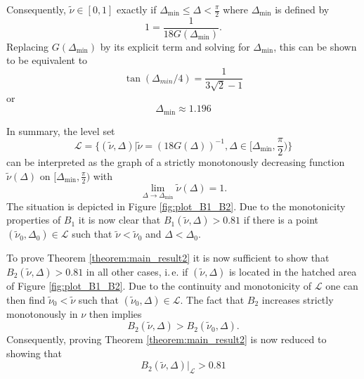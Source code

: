 \documentclass{article}
\newcommand{\ite}{i.\,e.\xspace}
\begin{document}
Consequently, $\tilde\nu\in[0,1]$ exactly if $\Delta_{\text{min}}\le\Delta<\frac\pi 2$ where $\Delta_{\text{min}}$ is defined by
\begin{equation}\label{eq:def_Delta_min}
    1 = \frac{1}{18G(\Delta_{\text{min}})}.
\end{equation}
Replacing $G(\Delta_{\text{min}})$ by its explicit term and solving for $\Delta_{\text{min}}$, this can be shown to be equivalent to
\[\tan(\Delta_{min}/4) = \frac{1}{3\sqrt 2 - 1}\]
or
\[\Delta_{\text{min}}\approx 1.196\]

In summary, the level set
\begin{equation}
    \mathcal{L} = \{(\tilde\nu,\Delta)|  \tilde\nu = (18G(\Delta))^{-1}, \Delta\in[\Delta_{\text{min}}, \frac\pi 2)\}
\end{equation}
can be interpreted as the graph of a strictly monotonously decreasing function $\tilde\nu(\Delta)$ on $[\Delta_{\text{min}},\frac\pi 2)$ with
\[\lim_{\Delta\rightarrow\Delta_{\text{min}}}\tilde\nu(\Delta) = 1.\]
The situation is depicted in Figure \ref{fig:plot_B1_B2}.
Due to the monotonicity properties of $B_1$ it is now clear that $B_1(\tilde\nu, \Delta) > 0.81$ if there is a point $(\tilde\nu_0 ,\Delta_0) \in \mathcal{L}$ such that $\tilde\nu < \tilde\nu_0$ and $\Delta < \Delta_0$.

To prove Theorem \ref{theorem:main_result2} it is now sufficient to show that $B_2(\tilde\nu, \Delta) > 0.81$ in all other cases, \ite if $(\tilde\nu ,\Delta)$ is located in the hatched area of Figure \ref{fig:plot_B1_B2}. Due to the continuity and monotonicity of $\mathcal{L}$ one can then find $\tilde\nu_0 < \tilde\nu$ such that $(\tilde\nu_0, \Delta)\in\mathcal{L}$. The fact that $B_2$ increases strictly monotonously in $\nu$ then implies
\[B_2(\tilde\nu, \Delta) > B_2(\tilde\nu_0,\Delta).\]
Consequently, proving Theorem \ref{theorem:main_result2} is now reduced to showing that
\[B_2(\tilde\nu,\Delta)|_{\mathcal{L}} > 0.81\]
\end{document}
